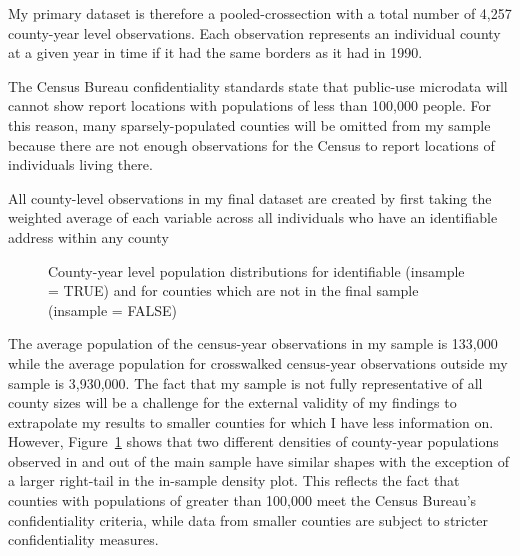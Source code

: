 \documentclass[12pt]{article}
\begin{document}
My primary dataset is therefore a pooled-crossection with a total number
of 4,257 county-year level observations. Each observation represents an
individual county at a given year in time if it had the same borders as
it had in 1990.

The Census Bureau confidentiality standards state that public-use
microdata will cannot show report locations with populations of less
than 100,000 people. For this reason, many sparsely-populated counties
will be omitted from my sample because there are not enough observations
for the Census to report locations of individuals living there.

All county-level observations in my final dataset are created by first taking the weighted average of each variable across all individuals who have an identifiable address within any county 

\label{cell-fig-comparesamplepops}
\begin{figure}[H]
\caption{\label{fig-comparesamplepops}County-year level population
distributions for identifiable (insample = TRUE) and for counties which are not in the final sample (insample = FALSE)}
\end{figure}%

The average population of the census-year observations in my sample is
133,000 while the average population for
crosswalked census-year observations outside my sample is
3,930,000. The fact that my sample is not
fully representative of all county sizes will be a challenge for the
external validity of my findings to extrapolate my results to smaller
counties for which I have less information on. However,
Figure~\ref{fig-comparesamplepops} shows that two different densities of
county-year populations observed in and out of the main sample have
similar shapes with the exception of a larger right-tail in the
in-sample density plot. This reflects the fact that counties with
populations of greater than 100,000 meet the Census Bureau's
confidentiality criteria, while data from smaller counties are subject
to stricter confidentiality measures.
\end{document}
